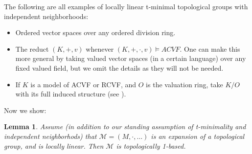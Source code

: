 \documentclass{amsart}
\newtheorem{lemma}[theorem]{Lemma}
\theoremstyle{definition}
\begin{document}
The following are all examples of locally linear t-minimal topological groups with independent neighborhoods:

\begin{itemize}
    \item Ordered vector spaces over any ordered division ring.
    \item The reduct $(K,+,v)$ whenever $(K,+,\cdot,v)\models ACVF$. One can make this more general by taking valued vector spaces (in a certain language) over any fixed valued field, but we omit the details as they will not be needed.
    \item If $K$ is a model of ACVF or RCVF, and $O$ is the valuation ring, take $K/O$ with its full induced structure (see \cite[Corollary 3.12, \S 6.3]{HaHaPeVF}).
\end{itemize}

Now we show:

\begin{lemma}
    Assume (in addition to our standing assumption of t-minimality and independent neighborhods) that $\mathcal M=(M,\cdot,\dots)$ is an expansion of a topological group, and is locally linear. Then $\mathcal M$ is topologically 1-based.
\end{lemma}
\end{document}

